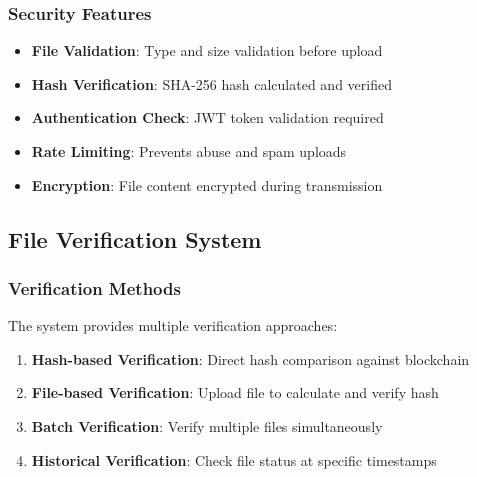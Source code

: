 \documentclass[11pt,a4paper]{article}
\begin{document}
\subsubsection{Security Features}
\begin{itemize}
    \item \textbf{File Validation}: Type and size validation before upload
    \item \textbf{Hash Verification}: SHA-256 hash calculated and verified
    \item \textbf{Authentication Check}: JWT token validation required
    \item \textbf{Rate Limiting}: Prevents abuse and spam uploads
    \item \textbf{Encryption}: File content encrypted during transmission
\end{itemize}

\subsection{File Verification System}

\subsubsection{Verification Methods}
The system provides multiple verification approaches:

\begin{enumerate}
    \item \textbf{Hash-based Verification}: Direct hash comparison against blockchain
    \item \textbf{File-based Verification}: Upload file to calculate and verify hash
    \item \textbf{Batch Verification}: Verify multiple files simultaneously
    \item \textbf{Historical Verification}: Check file status at specific timestamps
\end{enumerate}
\end{document}
